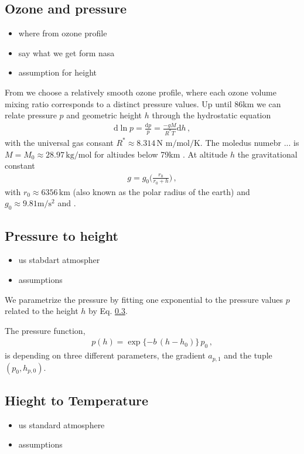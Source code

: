 \subsection{Ozone and pressure}
\begin{itemize}
	\item where from ozone profile
	\item say what we get form nasa
	\item assumption for height
\end{itemize}


From \cite{} we choose a relatively smooth ozone profile, where each ozone volume mixing ratio corresponds to a distinct pressure values.
Up until $86$km we can relate pressure $p$ and geometric height $h$ through the hydrostatic equation
\begin{align}
	\text{d} \ln p= \frac{\text{d}p}{p} = \frac{- g M}{R^* T} \text{d} h \, ,
\end{align}
with the universal gas consant $R^* \approx 8.314  \, \text{N m} / \text{mol} / \text{K}$. The moledus numebr ... is $M = M_0 \approx 28.97 \, \text{kg}/\text{mol}$ for altiudes below 79km \cite{}.
At altitude $h$ the gravitational constant
\begin{align}
	g = g_0 \Bigg( \frac{r_0}{r_0 + h} \Bigg) \, ,
\end{align}
with $r_0 \approx 6356 \, \text{km}$ (also known as the polar radius of the earth) and $g_0 \approx 9.81 \text{m}/\text{s}^2$ and \cite{}.
\subsection{Pressure to height}
\begin{itemize}
	\item us stabdart atmospher
	\item assumptions
\end{itemize}
We parametrize the pressure by fitting one exponential to the pressure values $p$ related to the height $h$ by Eq. \ref{}.

The pressure function,
\begin{align}
	p(h) =
		\exp{ \{ -b \,  (h - h_{0} ) \} } \,  p_0 \, ,
		\label{eq:pressFunc}
\end{align}
is depending on three different parameters, the gradient $a_{p,1}$ and the tuple $(p_0,h_{p,0})$.


\subsection{Hieght to Temperature}
\begin{itemize}
	\item us standard atmosphere
	\item assumptions
\end{itemize}


